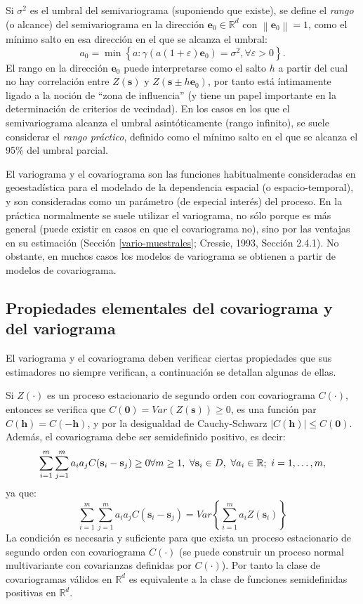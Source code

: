 \documentclass[
  spanish,
]{book}
\theoremstyle{break}
\theoremstyle{definition}
\theoremstyle{definition}
\theoremstyle{definition}
\theoremstyle{definition}
\theoremstyle{remark}
\begin{document}
Si \(\sigma ^{2}\) es el umbral del semivariograma (suponiendo que existe), se define el \emph{rango} (o alcance) del semivariograma en la dirección \(\mathbf{e}_0 \in \mathbb{R}^{d}\) con \(\left\| \mathbf{e}_0 \right\| = 1\), como el mínimo salto en esa dirección en el que se alcanza el umbral:
\[a_0 =\min \left\{ a:\gamma (a\left( 1+\varepsilon \right) \mathbf{e}_0 )=\sigma ^{2} , \forall \varepsilon >0\right\}.\]
El rango en la dirección \(\mathbf{e}_0\) puede interpretarse como el salto \(h\) a partir del cual no hay correlación entre \(Z(\mathbf{s})\) y \(Z(\mathbf{s}\pm h\mathbf{e}_0)\), por tanto está íntimamente ligado a la noción de ``zona de influencia'' (y tiene un papel importante en la determinación de criterios de vecindad).
En los casos en los que el semivariograma alcanza el umbral asintóticamente (rango infinito), se suele considerar el \emph{rango práctico}, definido como el mínimo salto en el que se alcanza el 95\% del umbral parcial.

El variograma y el covariograma son las funciones habitualmente consideradas en geoestadística para el modelado de la dependencia espacial (o espacio-temporal), y son consideradas como un parámetro (de especial interés) del proceso.
En la práctica normalmente se suele utilizar el variograma, no sólo porque es más general (puede existir en casos en que el covariograma no), sino por las ventajas en su estimación (Sección \ref{vario-muestrales}; Cressie, 1993, Sección 2.4.1).
No obstante, en muchos casos los modelos de variograma se obtienen a partir de modelos de covariograma.

\hypertarget{propiedades-elementales}{%
\subsection{Propiedades elementales del covariograma y del variograma}\label{propiedades-elementales}}

El variograma y el covariograma deben verificar ciertas propiedades que sus estimadores no siempre verifican, a continuación se detallan algunas de ellas.

Si \(Z(\cdot)\) es un proceso estacionario de segundo orden con covariograma \(C(\cdot)\),
entonces se verifica que \(C(\mathbf{0}) = Var( Z(\mathbf{s}) ) \geq 0\), es una función par \(C(\mathbf{h})=C(-\mathbf{h})\), y por la desigualdad de Cauchy-Schwarz \(\left| C(\mathbf{h})\right| \leq C(\mathbf{0})\).
Además, el covariograma debe ser semidefinido positivo, es decir:
\[\sum\limits_{i=1}^{m} \sum\limits_{j=1}^{m} a_i a_j C(\mathbf{s}_i-\mathbf{s}_j) \geq 0  \\
\forall m\geq 1,\ \forall \mathbf{s}_i \in D,\ \forall a_i \in \mathbb{R};\ i=1, \ldots,m,\]
ya que:
\[\sum\limits_{i=1}^{m}\sum\limits_{j=1}^{m}a_i a_j C(\mathbf{s}_i -\mathbf{s}_j) = Var\left\{\sum\limits_{i=1}^{m}a_i Z(\mathbf{s}_i) \right\}\]
La condición es necesaria y suficiente para que exista un proceso estacionario de segundo orden con covariograma \(C(\cdot)\) (se puede construir un proceso normal multivariante con covarianzas definidas por \(C(\cdot)\)).
Por tanto la clase de covariogramas válidos en \(\mathbb{R}^d\) es equivalente a la clase de funciones semidefinidas positivas en \(\mathbb{R}^d\).
\end{document}
